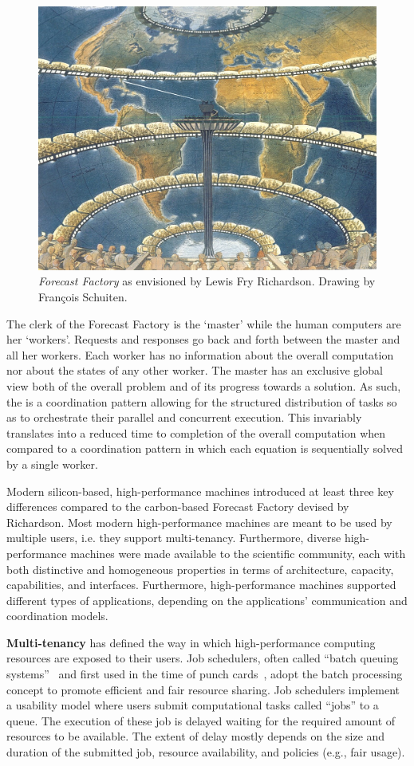 \documentclass{sig-alternate}
\begin{document}
\begin{figure}[t]
  \centering
    \includegraphics[width=.45\textwidth]{figures/forecast-factory.jpg}
  \caption{\textit{Forecast Factory} as envisioned by Lewis Fry Richardson.
    Drawing by Fran{\c c}ois Schuiten.}
  \label{fig:figures_forecast-factory}
\end{figure}

The clerk of the Forecast Factory is the `master' while the human computers are
her `workers'. Requests and responses go back and forth between the master and
all her workers. Each worker has no information about the overall computation
nor about the states of any other worker.  The master has an exclusive global
view both of the overall problem and of its progress towards a solution. As
such, the {\bf \MW} is a coordination pattern allowing for the structured
distribution of tasks so as to orchestrate their parallel and concurrent
execution.  This invariably translates into a reduced time to completion of the
overall computation when compared to a coordination pattern in which each
equation is sequentially solved by a single worker.

Modern silicon-based, high-performance machines introduced at least three key
differences compared to the carbon-based Forecast Factory devised by
Richardson. Most modern high-performance machines are meant to be used by
multiple users, i.e. they support multi-tenancy. Furthermore, diverse
high-performance machines were made available to the scientific community, each
with both distinctive and homogeneous properties in terms of architecture,
capacity, capabilities, and interfaces. Furthermore, high-performance machines
supported different types of applications, depending on the applications'
communication and coordination models.

{\bf Multi-tenancy} has defined the way in which high-performance computing
resources are exposed to their users. Job schedulers, often called ``batch
queuing systems''~\cite{czajkowski1998} and first used in the time of punch
cards~\cite{katz1966,silberschatz1998}, adopt the batch processing concept to
promote efficient and fair resource sharing. Job schedulers implement a
usability model where users submit computational tasks called ``jobs'' to a
queue. The execution of these job is delayed waiting for the required amount of
resources to be available. The extent of delay mostly depends on the size and
duration of the submitted job, resource availability, and policies (e.g., fair
usage).
\end{document}
